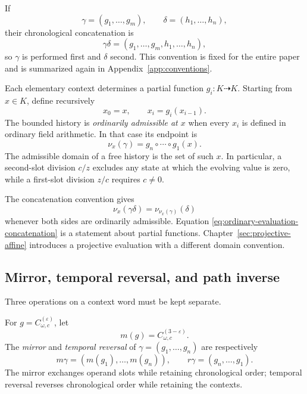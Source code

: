 If
\[
  \gamma=(g_1,\ldots,g_m),
  \qquad
  \delta=(h_1,\ldots,h_n),
\]
their chronological concatenation is
\begin{equation}
  \gamma\delta=(g_1,\ldots,g_m,h_1,\ldots,h_n),
  \label{eq:chronological-history-concatenation}
\end{equation}
so $\gamma$ is performed first and $\delta$ second.  This convention is fixed
for the entire paper and is summarized again in Appendix~\ref{app:conventions}.

Each elementary context determines a partial function $g_i\colon K\dashrightarrow
K$.  Starting from $x\in K$, define recursively
\[
  x_0=x,
  \qquad
  x_i=g_i(x_{i-1}).
\]
The bounded history is \emph{ordinarily admissible at $x$} when every $x_i$
is defined in ordinary field arithmetic.  In that case its endpoint is
\begin{equation}
  \nu_x(\gamma)
  =g_n\circ\cdots\circ g_1(x).
  \label{eq:ordinary-history-evaluation}
\end{equation}
The admissible domain of a free history is the set of such $x$.  In particular,
a second-slot division $c/z$ excludes any state at which the evolving value is
zero, while a first-slot division $z/c$ requires $c\neq0$.

The concatenation convention gives
\begin{equation}
  \nu_x(\gamma\delta)
  =\nu_{\nu_x(\gamma)}(\delta)
  \label{eq:ordinary-evaluation-concatenation}
\end{equation}
whenever both sides are ordinarily admissible.  Equation
\eqref{eq:ordinary-evaluation-concatenation} is a statement about partial
functions.  Chapter~\ref{sec:projective-affine} introduces a projective
evaluation with a different domain convention.

\subsection{Mirror, temporal reversal, and path inverse}

Three operations on a context word must be kept separate.

\begin{definition}
\label{def:mirror-temporal-reversal}
For $g=C_{\omega,c}^{(\varepsilon)}$, let
\[
  m(g)=C_{\omega,c}^{(3-\varepsilon)}.
\]
The \emph{mirror} and \emph{temporal reversal} of
$\gamma=(g_1,\ldots,g_n)$ are respectively
\[
  m\gamma=(m(g_1),\ldots,m(g_n)),
  \qquad
  r\gamma=(g_n,\ldots,g_1).
\]
The mirror exchanges operand slots while retaining chronological order;
temporal reversal reverses chronological order while retaining the contexts.
\end{definition}

